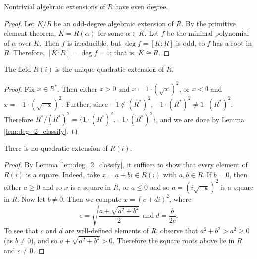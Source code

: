 \begin{lemma}
  \label{lem:alg_ext_odd_deg}
  Nontrivial algebraic extensions of $R$ have even degree.
\end{lemma}
\begin{proof}
  Let $K/R$ be an odd-degree algebraic extension of $R$. By the primitive element theorem, $K=R(\alpha)$ for some $\alpha\in K$. Let $f$ be the minimal polynomial of $\alpha$ over $K$. Then $f$ is irreducible, but $\deg f=[K:R]$ is odd, so $f$ has a root in $R$. Therefore, $[K:R]=\deg f=1$; that is, $K\cong R$.
\end{proof}

\begin{lemma}
  \label{lem:ext_deg_2}
  The field $R(i)$ is the unique quadratic extension of $R$.
\end{lemma}
\begin{proof}
  Fix $x\in R^*$. Then either $x>0$ and $x=1\cdot(\sqrt{x})^2$, or $x<0$ and $x=-1\cdot(\sqrt{-x})^2$. Further, since $-1\notin(R^*)^2$, $-1\cdot(R^*)^2\neq 1\cdot(R^*)^2$. Therefore $R^*/{(R^*)^2}=\{1\cdot(R^*)^2,-1\cdot(R^*)^2\}$, and we are done by Lemma \ref{lem:deg_2_classify}.
\end{proof}

\begin{lemma}
  \label{lem:Ri_ext_deg_2}
  There is no quadratic extension of $R(i)$.
\end{lemma}
\begin{proof}
  By Lemma \ref{lem:deg_2_classify}, it suffices to show that every element of $R(i)$ is a square. Indeed, take $x=a+bi\in R(i)$ with $a,b\in R$. If $b=0$, then either $a\geq0$ and so $x$ is a square in $R$, or $a\leq0$ and so $a=(i\sqrt{-a})^2$ is a square in $R$. Now let $b\neq0$. Then we compute $x=(c+di)^2$, where
  \[c=\sqrt{\frac{a+\sqrt{a^2+b^2}}{2}}\text{ and }d=\frac{b}{2c}.\]
  To see that $c$ and $d$ are well-defined elements of $R$, observe that $a^2+b^2>a^2\geq0$ (as $b\neq0$), and so $a+\sqrt{a^2+b^2}>0$. Therefore the square roots above lie in $R$ and $c\neq0$.
\end{proof}

